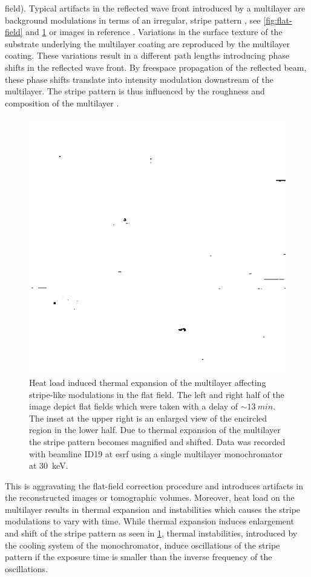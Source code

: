 \documentclass[
twoside,
openright,
titlepage,
numbers=noenddot,
headinclude,
fleqn,
a4paper,
footinclude=true,
cleardoublepage=empty,
abstractoff,
BCOR=5mm,
paper=a4,
fontsize=11pt,
british,ngerman,american,
]{scrreprt}
\begin{document}
field).  Typical artifacts in the reflected wave front introduced by a
multilayer are background modulations in terms of an irregular, stripe
pattern \cite{Rack2010,Dietsch2011,Moosmann2013nature}, see \eg{}
\cref{fig:flat-field} and \cref{fig:flat-thermal-expansion} or images
in reference \cite{Rack2010}.  Variations in the surface texture of
the substrate underlying the multilayer coating are reproduced by the
multilayer coating.  These variations result in a different path
lengths introducing phase shifts in the reflected wave front.  By
free\hyph space propagation of the reflected beam, these phase shifts
translate into intensity modulation downstream of the multilayer.  The
stripe pattern is thus influenced by the roughness and composition of
the multilayer \cite{Dietsch2011,Rack2010}.
\begin{figure}
  \centering
  \includegraphics*[width=.5\textwidth]
  {figures/FlatField_ThermalExpansion/FlatField_ThermalExpansion.png}
  \caption[Heat load induced flat-field modulations.]{Heat load
    induced thermal expansion of the multilayer affecting stripe-like
    modulations in the flat field.  The left and right half of the
    image depict flat fields which were taken with a delay of
    $\sim\SI{13}{min}$.  The inset at the upper right is an enlarged
    view of the encircled region in the lower half.  Due to thermal
    expansion of the multilayer the stripe pattern becomes magnified
    and shifted.  Data was recorded with beamline ID19 at \ac{esrf}
    using a single multilayer monochromator at \SI{30}{keV}.}
  \label{fig:flat-thermal-expansion}
\end{figure}
This is aggravating the flat-field correction procedure and introduces
artifacts in the reconstructed images or tomographic volumes.
Moreover, heat load on the multilayer results in thermal expansion and
instabilities which causes the stripe modulations to vary with time.
While thermal expansion induces  enlargement and shift of the stripe
pattern as seen in \cref{fig:flat-thermal-expansion}, thermal
instabilities, \eg{} introduced by the cooling system of the
monochromator, induce oscillations of the stripe pattern if the
exposure time is smaller than the inverse frequency of the
oscillations.
\end{document}
